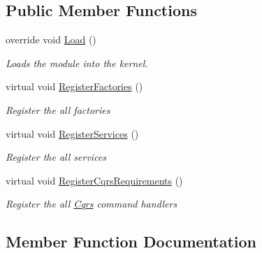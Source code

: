 \subsection*{Public Member Functions}
\begin{DoxyCompactItemize}
\item 
override void \hyperlink{classCqrs_1_1Ninject_1_1MongoDB_1_1Configuration_1_1MongoDbEventStoreModule_aafdbd906511857f65cbd0789d458be18_aafdbd906511857f65cbd0789d458be18}{Load} ()
\begin{DoxyCompactList}\small\item\em Loads the module into the kernel. \end{DoxyCompactList}\item 
virtual void \hyperlink{classCqrs_1_1Ninject_1_1MongoDB_1_1Configuration_1_1MongoDbEventStoreModule_a32cbf7060777484eb68c4dc032109e6c_a32cbf7060777484eb68c4dc032109e6c}{Register\+Factories} ()
\begin{DoxyCompactList}\small\item\em Register the all factories \end{DoxyCompactList}\item 
virtual void \hyperlink{classCqrs_1_1Ninject_1_1MongoDB_1_1Configuration_1_1MongoDbEventStoreModule_abbb71b43dadafb70410ef2ff491f5108_abbb71b43dadafb70410ef2ff491f5108}{Register\+Services} ()
\begin{DoxyCompactList}\small\item\em Register the all services \end{DoxyCompactList}\item 
virtual void \hyperlink{classCqrs_1_1Ninject_1_1MongoDB_1_1Configuration_1_1MongoDbEventStoreModule_aec046bc34e4aaf11a0cae5ebb2bb6db1_aec046bc34e4aaf11a0cae5ebb2bb6db1}{Register\+Cqrs\+Requirements} ()
\begin{DoxyCompactList}\small\item\em Register the all \hyperlink{namespaceCqrs}{Cqrs} command handlers \end{DoxyCompactList}\end{DoxyCompactItemize}


\subsection{Member Function Documentation}
\mbox{\label{classCqrs_1_1Ninject_1_1MongoDB_1_1Configuration_1_1MongoDbEventStoreModule_aafdbd906511857f65cbd0789d458be18_aafdbd906511857f65cbd0789d458be18}} 

